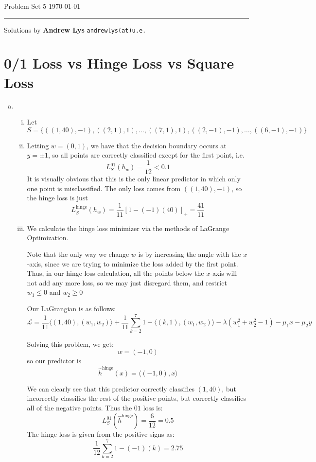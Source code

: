 \documentclass{amsart}
\newcommand{\hinge}{\hat{h}^{\mathrm{hinge}}}
\theoremstyle{definition}
\begin{document}
\noindent
Problem Set 5   \hfill \today  %
\smallskip
\hrule
\smallskip
\noindent
Solutions by {\bf Andrew Lys} \qquad   %
  {\tt andrewlys(at)u.e.}      %

\vspace{0.5cm}

\section{0/1 Loss vs Hinge Loss vs Square Loss}
\begin{enumerate}[(a)]
  \item 
    \begin{enumerate}[(i)]
      \item 
        Let \[
          S = \{((1, 40), -1), ((2,1),1), \ldots, ((7,1),1), ((2, -1),-1), \ldots ,((6, -1), -1)\}
        \]
      \item 
        Letting $w = (0, 1)$, we have that the decision boundary occurs at $y = \pm 1$, so all points are correctly classified except for the first point, i.e. 
        \[
          L_S^{01}(h_w) = \displaystyle\frac{1}{12} < 0.1
        \]
        It is visually obvious that this is the only linear predictor in which only one point is misclassified. 
        The only loss comes from $((1, 40), -1)$, so the hinge loss is just 
        \[
          L_S^{\mathrm{hinge}}(h_w) = \displaystyle\frac{1}{11} [1 - (-1)(40)]_+ = \displaystyle\frac{41}{11}
        \]
      \item 
        We calculate the hinge loss minimizer via the methods of LaGrange Optimization. 

        Note that the only way we change $w$ is by increasing the angle with the $x$-axis, since we are trying to minimize the loss added by the first point. Thus, in our hinge loss calculation, all the points below the $x$-axis will not add any more loss, so we may just disregard them, and restrict $w_1 \le 0$ and $w_2 \ge 0$

        Our LaGrangian is as follows:
        \[
          \mathcal{L} = \displaystyle\frac{1}{11} \langle (1, 40), (w_1, w_2)\rangle + \displaystyle\frac{1}{11}\displaystyle\sum_{k = 2 }^{7 }1 - \langle (k, 1), (w_1, w_2) \rangle  - \lambda (w_1^2 + w_2^2  - 1) - \mu_1 x - \mu_2 y
        \]

        Solving this problem, we get:
        \[
          w = (-1, 0)
        \]
        so our predictor is 
        \[
          \hat{h}^{\mathrm{hinge}}(x) = \langle (-1, 0), x\rangle 
        \]

        We can clearly see that this predictor correctly classifies $(1, 40)$, but incorrectly classifies the rest of the positive points, but correctly classifies all of the negative points. Thus the $01$ loss is:
        \[
          L_S^{01}(\hinge) = \displaystyle\frac{6 }{12} = 0.5
        \]
        The hinge loss is given from the positive signs as:
        \[
          \displaystyle\frac{1}{12}\displaystyle\sum_{k=2 }^{7 } 1 - (-1)(k) = 2.75
        \]
    \end{enumerate}
\end{enumerate}
\end{document}
